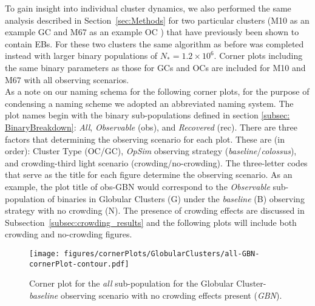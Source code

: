 \documentclass[twocolumn]{aastex63}
\begin{document}
To gain insight into individual cluster dynamics, we also performed the same analysis described in Section~\ref{sec:Methods} for two particular clusters (M10 as an example GC \citet{2003PASP..115..272V} and M67 as an example OC \citet{2016AAS...22811701S}) that have previously been shown to contain EBs. For these two clusters the same algorithm as before was completed instead with larger binary populations of $N_* = 1.2 \times 10^6$. Corner plots including the same binary parameters as those for GCs and OCs are included for M10 and M67 with all observing scenarios. \\


As a note on our naming schema for the following corner plots, for the purpose of condensing a naming scheme we adopted an abbreviated naming system. The plot names begin with the binary sub-populations defined in section \ref{subsec: BinaryBreakdown}: \textit{All}, \textit{Observable} (obs), and \textit{Recovered} (rec). There are three factors that determining the observing scenario for each plot. These are (in order): Cluster Type (OC/GC), \textit{OpSim} observing strategy (\textit{baseline}/\textit{colossus}), and crowding-third light scenario (crowding/no-crowding). The three-letter codes that serve as the title for each figure determine the observing scenario. As an example, the plot title of obs-GBN would correspond to the \textit{Observable} sub-population of binaries in Globular Clusters (G) under the \textit{baseline} (B) observing strategy with no crowding (N). The presence of crowding effects are discussed in Subsection~\ref{subsec:crowding_results} and the following plots will include both crowding and no-crowding figures.\\

\begin{figure}
    \centering
    \texttt{[image: figures/cornerPlots/GlobularClusters/all-GBN-cornerPlot-contour.pdf]}
    \caption{Corner plot for the \textit{all} sub-population for the Globular Cluster-\textit{baseline} observing scenario with no crowding effects present (\textit{GBN}).}
    \label{fig:gbn-corner-plot-appendix}
\end{figure}\clearpage
\end{document}

